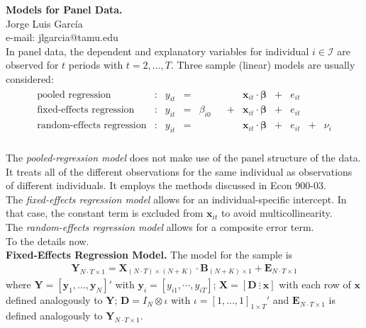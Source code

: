 
\let\counterwithout\relax
\let\counterwithin\relax
{}



\noindent \textbf{Models for Panel Data.}\\
\noindent Jorge Luis García \\
\noindent e-mail: jlgarcia@tamu.edu\\

\noindent In panel data, the dependent and explanatory variables for individual $i \in \mathcal{I}$ are observed for $t$ periods with $t = 2, \ldots, T$. Three sample (linear) models are usually considered:
\begin{align}
	\begin{array}{lccccccccccc}
	\text{pooled regression} & : & y_{it} & = & & & & \bm{x}_{it} \cdot \bm{\beta} & + & e_{it} &  \nonumber \\ 
	\text{fixed-effects regression} & : & y_{it} & = & \beta_{i0} & & + &  \bm{x}_{it} \cdot \bm{\beta}  & + & e_{it} & \nonumber \\ 
	\text{random-effects regression} & : & y_{it} & = & & & &  \bm{x}_{it}  \cdot \bm{\beta} & + & e_{it} & + & \nu_{i} \nonumber \\ 
	\end{array}
\end{align}

\noindent The \textit{pooled-regression model} does not make use of the panel structure of the data. It treats all of the different observations for the same individual as observations of different individuals. It employs the methods discussed in Econ 900-03.\\

\noindent The \textit{fixed-effects regression model} allows for an individual-specific intercept. In that case, the constant term is excluded from $\bm{x}_{it}$ to avoid multicollinearity.\\ 

\noindent The \textit{random-effects regression model} allows for a composite error term.\\ 

\noindent To the details now.\\

\noindent \textbf{Fixed-Effects Regression Model.} The model for the sample is
		\begin{align}
			\bm{Y}_{N \cdot T \times 1} = \bm{X}_{\left( N \cdot T \right) \times \left( N+K \right)} \cdot \bm{B}_{\left( N+K \right) \times 1} + \bm{E}_{N \cdot T \times 1}
		\end{align}
\noindent where $\bm{Y} = \left[\bm{y}_1, \ldots, \bm{y}_N \right]'$ with  $\bm{y}_i = \left[y_{i1}, \cdots, y_{iT} \right]$; $\bm{X} = \left[ \bm{D} \ \vdots \ \bm{x} \right]$ with each row of $\bm{x}$ defined analogously to $\bm{Y}$; $\bm{D} = I_N \otimes \iota$ with $\iota = \left[ 1, \ldots, 1 \right]_{1 \times T}'$ and $\bm{E}_{N \cdot T \times 1}$ is defined analogously to $\bm{Y}_{N \cdot T \times 1}$.\\ 

